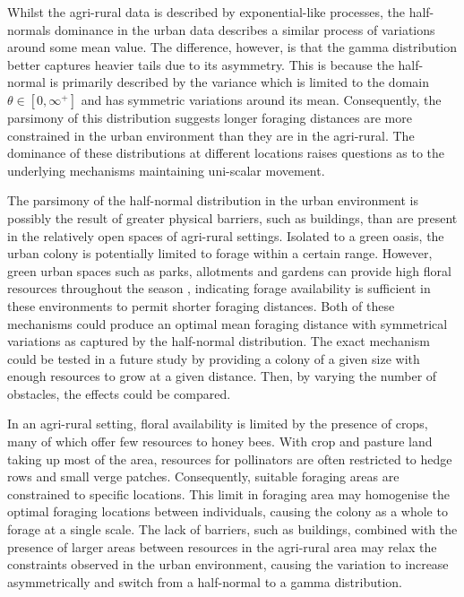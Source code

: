 \documentclass[11pt,usenames,dvipsnames]{article}
\begin{document}
\begin{linenumbers}
Whilst the agri-rural data is described by exponential-like processes, the half-normals dominance in the urban data describes a similar process of variations around some mean value. The difference, however, is that the gamma distribution better captures heavier tails due to its asymmetry. This is because the half-normal is primarily described by the variance which is limited to the domain $\theta \in [0,\infty^+]$ and has symmetric variations around its mean. Consequently, the parsimony of this distribution suggests longer foraging distances are more constrained in the urban environment than they are in the agri-rural. The dominance of these distributions at different locations raises questions as to the underlying mechanisms maintaining uni-scalar movement.

The parsimony of the half-normal distribution in the urban environment is possibly the result of greater physical barriers, such as buildings, than are present in the relatively open spaces of agri-rural settings. Isolated to a green oasis, the urban colony is potentially limited to forage within a certain range. However, green urban spaces such as parks, allotments and gardens can provide high floral resources throughout the season \citep{Baldock2015, Baldock2019, Plascencia2017}, indicating forage availability is sufficient in these environments to permit shorter foraging distances. Both of these mechanisms could produce an optimal mean foraging distance with symmetrical variations as captured by the half-normal distribution. The exact mechanism could be tested in a future study by providing a colony of a given size with enough resources to grow at a given distance. Then, by varying the number of obstacles, the effects could be compared. 

In an agri-rural setting, floral availability is limited by the presence of crops, many of which offer few resources to honey bees. With crop and pasture land taking up most of the area, resources for pollinators are often restricted to hedge rows and small verge patches. Consequently, suitable foraging areas are constrained to specific locations. This limit in foraging area may homogenise the optimal foraging locations between individuals, causing the colony as a whole to forage at a single scale. The lack of barriers, such as buildings, combined with the presence of larger areas between resources in the agri-rural area may relax the constraints observed in the urban environment, causing the variation to increase asymmetrically and switch from a half-normal to a gamma distribution.


\end{linenumbers}
\end{document}
